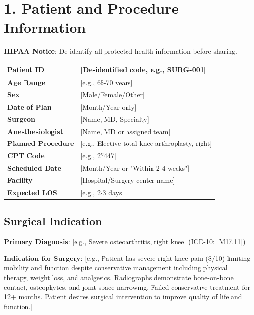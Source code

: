 \documentclass[11pt,letterpaper]{article}
\begin{document}
\section*{1. Patient and Procedure Information}

\textbf{HIPAA Notice}: De-identify all protected health information before sharing.

\vspace{0.5em}

\begin{tabularx}{\textwidth}{|l|X|}
\hline
\textbf{Patient ID} & [De-identified code, e.g., SURG-001] \\ \hline
\textbf{Age Range} & [e.g., 65-70 years] \\ \hline
\textbf{Sex} & [Male/Female/Other] \\ \hline
\textbf{Date of Plan} & [Month/Year only] \\ \hline
\textbf{Surgeon} & [Name, MD, Specialty] \\ \hline
\textbf{Anesthesiologist} & [Name, MD or assigned team] \\ \hline
\textbf{Planned Procedure} & [e.g., Elective total knee arthroplasty, right] \\ \hline
\textbf{CPT Code} & [e.g., 27447] \\ \hline
\textbf{Scheduled Date} & [Month/Year or "Within 2-4 weeks"] \\ \hline
\textbf{Facility} & [Hospital/Surgery center name] \\ \hline
\textbf{Expected LOS} & [e.g., 2-3 days] \\ \hline
\end{tabularx}

\vspace{1em}

\subsection*{Surgical Indication}

\textbf{Primary Diagnosis}: [e.g., Severe osteoarthritis, right knee] (ICD-10: [M17.11])

\textbf{Indication for Surgery}:
[e.g., Patient has severe right knee pain (8/10) limiting mobility and function despite conservative management including physical therapy, weight loss, and analgesics. Radiographs demonstrate bone-on-bone contact, osteophytes, and joint space narrowing. Failed conservative treatment for 12+ months. Patient desires surgical intervention to improve quality of life and function.]
\end{document}

